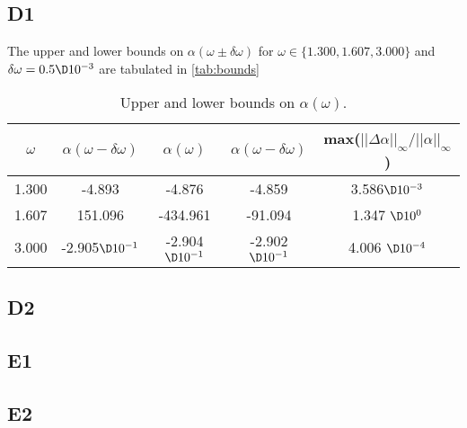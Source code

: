 \documentclass[a4paper,10pt]{article}
\begin{document}
	\subsection*{D1}
	The upper and lower bounds on $ \alpha(\omega\pm \delta \omega) $ for $ \omega \in \{1.300, 1.607, 3.000\} $ and $ \delta \omega = 0.5\D10^{-3} $ are tabulated in \ref{tab:bounds}
	\begin{table}[H]
		\centering
		\begin{tabular}{c|c|c|c|c}
			$ \omega $ & $ \alpha(\omega-\delta \omega) $ & $ \alpha(\omega) $ & $ \alpha(\omega-\delta \omega) $ & max($ ||\Delta\alpha||_{\infty}/||\alpha||_{\infty} $) \\
			\hline
			1.300 & -4.893 & -4.876 & -4.859 & 3.586$ \D10^{-3} $ \\
			1.607 & 151.096 & -434.961 & -91.094 & 1.347 $ \D10^0 $ \\
			3.000 & -2.905$ \D 10^{-1} $ & -2.904 $ \D 10^{-1} $ & -2.902 $ \D 10^{-1} $ & 4.006 $ \D 10^{-4} $
		\end{tabular}
		\caption{Upper and lower bounds on $ \alpha(\omega) $.}
	\end{table}
	
	\subsection*{D2}
	
	\subsection*{E1}
	
	
	\subsection*{E2}
	
	
\end{document}
